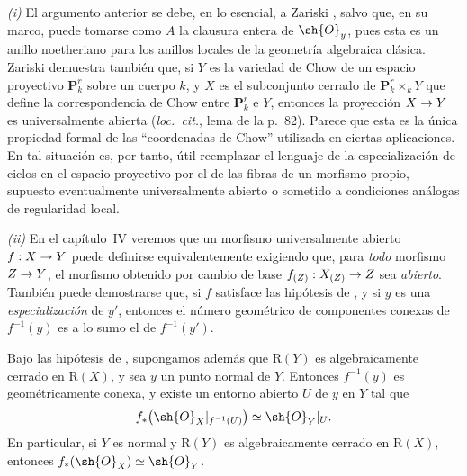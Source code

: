 \documentclass[oneside]{amsart}
\makeatletter
\newcommand{\ega@arrow}[2]{\mathchoice{#1}{#2}{#2}{#2}}
\renewcommand{\to}{\ega@arrow{\longrightarrow}{\rightarrow}}
\let\EGAOriginalLabel\label
\renewcommand{\label}[1]{\phantomsection\EGAOriginalLabel{#1}}
\makeatother
\begin{document}
\begin{remark}[4.3.11]
\label{III.4.3.11}
\emph{(i)}
El argumento anterior se debe, en lo esencial, a Zariski
\cite{I-20}, salvo que, en su marco, puede tomarse como $A$ la
clausura entera de $\sh{O}_y$, pues esta es un anillo noetheriano para
los anillos locales de la geometría algebraica clásica. Zariski
demuestra también que, si $Y$ es la variedad de Chow de un espacio
proyectivo $\mathbf{P}_k^r$ sobre un cuerpo $k$, y $X$ es el
subconjunto cerrado de $\mathbf{P}_k^r\times_kY$ que define la
correspondencia de Chow entre $\mathbf{P}_k^r$ e $Y$, entonces la
proyección $X\to Y$ es universalmente abierta (\emph{loc.\ cit.},
lema de la p.~82).
Parece que esta es la única propiedad formal de las ``coordenadas de
Chow'' utilizada en ciertas aplicaciones. En tal situación es, por
tanto, útil reemplazar el lenguaje de la especialización de ciclos en
el espacio proyectivo por el de las fibras de un morfismo propio,
supuesto eventualmente universalmente abierto o sometido a condiciones
análogas de regularidad local.

\emph{(ii)}
En el capítulo~IV veremos que un morfismo universalmente abierto
$f:X\to Y$ puede definirse equivalentemente exigiendo que, para \emph{todo}
morfismo $Z\to Y$, el morfismo obtenido por cambio de base
$f_{(Z)}:X_{(Z)}\to Z$ sea \emph{abierto}. También puede demostrarse que, si
$f$ satisface las hipótesis de , y si $y$ es una
\emph{especialización} de $y'$, entonces el número geométrico de componentes
conexas de $f^{-1}(y)$ es a lo sumo el de $f^{-1}(y')$.
\end{remark}

\begin{corollary}[4.3.12]
\label{III.4.3.12}
Bajo las hipótesis de , supongamos además que
$\mathrm{R}(Y)$ es algebraicamente cerrado en $\mathrm{R}(X)$, y sea
$y$ un punto normal de $Y$. Entonces $f^{-1}(y)$ es geométricamente
conexa, y existe un entorno abierto $U$ de $y$ en $Y$ tal que
\[
  f_*\bigl(\sh{O}_X|_{f^{-1}(U)}\bigr)
  \simeq
  \sh{O}_Y|_U.
\]
En particular, si $Y$ es normal y $\mathrm{R}(Y)$ es algebraicamente
cerrado en $\mathrm{R}(X)$, entonces
$f_*(\sh{O}_X)\simeq\sh{O}_Y$.
\end{corollary}
\end{document}

